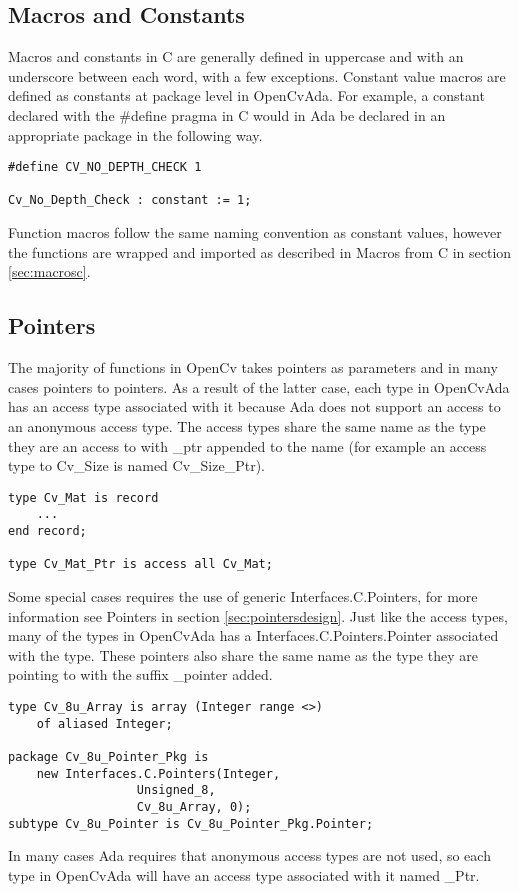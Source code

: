 \subsection{Macros and Constants}
Macros and constants in C are generally defined in uppercase and with an underscore between each word, with a few exceptions. Constant value macros are defined as constants at package level in OpenCvAda. For example, a constant declared with the \#define pragma in C would in Ada be declared in an appropriate package in the following way.
\begin{lstlisting}
#define CV_NO_DEPTH_CHECK 1

Cv_No_Depth_Check : constant := 1;
\end{lstlisting}
Function macros follow the same naming convention as constant values, however the functions are wrapped and imported as described in Macros from C in section \ref{sec:macrosc}.
\subsection{Pointers}
The majority of functions in OpenCv takes pointers as parameters and in many cases pointers to pointers. As a result of the latter case, each type in OpenCvAda has an access type associated with it because Ada does not support an access to an anonymous access type. The access types share the same name as the type they are an access to with _ptr appended to the name (for example an access type to Cv_Size is named Cv_Size_Ptr).
\begin{lstlisting}
type Cv_Mat is record
	...
end record;

type Cv_Mat_Ptr is access all Cv_Mat;
\end{lstlisting}
Some special cases requires the use of generic Interfaces.C.Pointers, for more information see Pointers in section \ref{sec:pointersdesign}. Just like the access types, many of the types in OpenCvAda has a Interfaces.C.Pointers.Pointer associated with the type. These pointers also share the same name as the type they are pointing to with the suffix _pointer added.
\begin{lstlisting}
type Cv_8u_Array is array (Integer range <>) 
	of aliased Integer;

package Cv_8u_Pointer_Pkg is
	new Interfaces.C.Pointers(Integer, 
				  Unsigned_8, 
				  Cv_8u_Array, 0);
subtype Cv_8u_Pointer is Cv_8u_Pointer_Pkg.Pointer;
\end{lstlisting}
In many cases Ada requires that anonymous access types are not used, so each type in OpenCvAda will have an access type associated with it named _Ptr.
